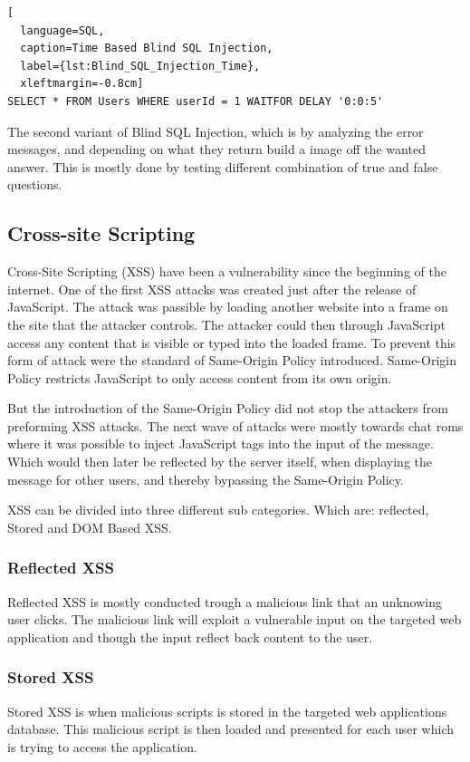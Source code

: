 \hfill
\begin{lstlisting}[
  language=SQL,
  caption=Time Based Blind SQL Injection,
  label={lst:Blind_SQL_Injection_Time},
  xleftmargin=-0.8cm]
SELECT * FROM Users WHERE userId = 1 WAITFOR DELAY '0:0:5'
\end{lstlisting}
\hfill

The second variant of Blind SQL Injection, which is by analyzing the error messages, and depending on what they return build a image off the wanted answer. This is mostly done by testing different combination of true and false questions. 
\parencite{JustinClarke-Salt2009SIAa, Secure_Web} 


\subsection{Cross-site Scripting}
Cross-Site Scripting (XSS) have been a vulnerability since the beginning of the internet. One of the first XSS attacks was created just after the release of JavaScript. The attack was passible by loading another website into a frame on the site that the attacker controls. The attacker could then through JavaScript access any content that is visible or typed into the loaded frame. To prevent this form of attack were the standard of Same-Origin Policy introduced. Same-Origin Policy restricts JavaScript to only access content from its own origin. \parencite{FogieSeth2007Xacs, w3csop}

But the introduction of the Same-Origin Policy did not stop the attackers from preforming XSS attacks. The next wave of attacks were mostly towards chat roms where it was possible to inject JavaScript tags into the input of the message. Which would then later be reflected by the server itself, when displaying the message for other users, and thereby bypassing the Same-Origin Policy. \parencite{FogieSeth2007Xacs}

XSS can be divided into three different sub categories. Which are: reflected, Stored and DOM Based XSS.

\subsubsection{Reflected XSS}
Reflected XSS is mostly conducted trough a malicious link that an unknowing user clicks. The malicious link will exploit a vulnerable input on the targeted web application and though the input reflect back content to the user. \parencite{Secure_Web}


\subsubsection{Stored XSS}
Stored XSS is when malicious scripts is stored in the targeted web applications database. This malicious script is then loaded and presented for each user which is trying to access the application. \parencite{Secure_Web}


